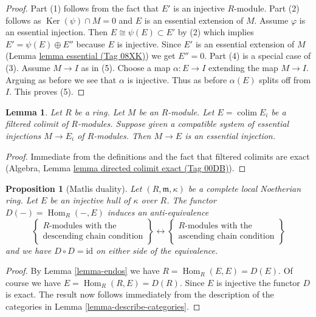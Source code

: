 \documentclass{amsart}
\theoremstyle{plain}
\newtheorem{proposition}[subsection]{Proposition}
\newtheorem{lemma}[subsection]{Lemma}
\theoremstyle{definition}
\theoremstyle{remark}
\numberwithin{equation}{subsection}
\def\colim{\mathop{\mathrm{colim}}\nolimits}
\def\Hom{\mathop{\mathrm{Hom}}\nolimits}
\def\Ker{\mathop{\mathrm{Ker}}}
\begin{document}
\begin{proof}
Part (1) follows from the fact that $E'$ is an injective $R$-module.
Part (2) follows as $\Ker(\psi) \cap M = 0$
and $E$ is an essential extension of $M$.
Assume $\varphi$ is an essential injection. Then
$E \cong \psi(E) \subset E'$ by (2) which implies
$E' = \psi(E) \oplus E''$ because $E$ is injective.
Since $E'$ is an essential extension of
$M$ (Lemma \href{https://stacks.math.columbia.edu/tag/08XK}{lemma essential (Tag 08XK)}) we get $E'' = 0$.
Part (4) is a special case of (3).
Assume $M \to I$ as in (5).
Choose a map $\alpha : E \to I$ extending the map $M \to I$.
Arguing as before we see that $\alpha$ is injective.
Thus as before $\alpha(E)$ splits off from $I$.
This proves (5).
\end{proof}


\begin{lemma}
\label{lemma-union-essential-extensions}
Let $R$ be a ring. Let $M$ be an $R$-module. Let $E = \colim E_i$
be a filtered colimit of $R$-modules. Suppose given a compatible
system of essential injections $M \to E_i$ of $R$-modules.
Then $M \to E$ is an essential injection.
\end{lemma}

\begin{proof}
Immediate from the definitions and the fact that filtered
colimits are exact (Algebra, Lemma \href{https://stacks.math.columbia.edu/tag/00DB}{lemma directed colimit exact (Tag 00DB)}).
\end{proof}


\begin{proposition}[Matlis duality]
\label{proposition-matlis}
Let $(R, \mathfrak m, \kappa)$ be a complete local Noetherian ring.
Let $E$ be an injective hull of $\kappa$ over $R$. The functor
$D(-) = \Hom_R(-, E)$ induces an anti-equivalence
$$
\left\{
\begin{matrix}
R\text{-modules with the} \\
\text{descending chain condition}
\end{matrix}
\right\}
\longleftrightarrow
\left\{
\begin{matrix}
R\text{-modules with the} \\
\text{ascending chain condition}
\end{matrix}
\right\}
$$
and we have $D \circ D = \text{id}$ on either side of the equivalence.
\end{proposition}

\begin{proof}
By Lemma \ref{lemma-endos} we have $R = \Hom_R(E, E) = D(E)$.
Of course we have $E = \Hom_R(R, E) = D(R)$. Since $E$ is injective
the functor $D$ is exact. The result now follows immediately from the
description of the categories in
Lemma \ref{lemma-describe-categories}.
\end{proof}
\end{document}
